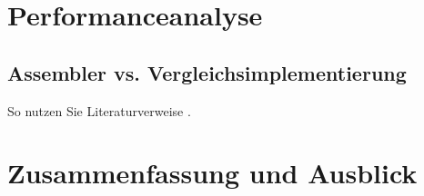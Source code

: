 \documentclass[course=erap]{aspdoc}
\begin{document}
\section{Performanceanalyse}
\subsection{Assembler vs. Vergleichsimplementierung}
So nutzen Sie Literaturverweise \cite{aristotle:physics}. 


\section{Zusammenfassung und Ausblick}



{}
\printbibliography
\end{document}
